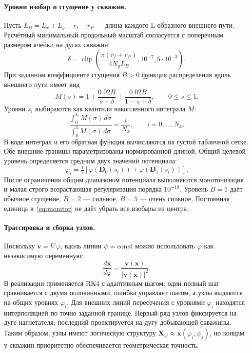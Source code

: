 \documentclass[12pt,a4paper]{article}
\begin{document}
\paragraph{Уровни изобар и сгущение у скважин.}
Пусть $L_B=L_x+L_y-r_I-r_P$ --- длина каждого L-образного внешнего пути.
Расчётный минимальный продольный масштаб согласуется с поперечным размером
ячейки на дугах скважин:
\begin{equation}
 \delta=\operatorname{clip}\!\left(
 \frac{\pi(r_I+r_P)}{4N_yL_B},10^{-7},5\cdot10^{-3}\right).
 \label{eq:grading-core}
\end{equation}
При заданном коэффициенте сгущения $B>0$ функция распределения вдоль
внешнего пути имеет вид
\begin{equation}
 M(s)=1+\frac{0.02B}{s+\delta}
       +\frac{0.02B}{1-s+\delta},\qquad 0\le s\le1.
 \label{eq:monitor}
\end{equation}
Уровни $s_i$ выбираются как квантили накопленного интеграла $M$:
\begin{equation}
 \frac{\int_0^{s_i}M(\sigma)\,d\sigma}
      {\int_0^1M(\sigma)\,d\sigma}=\frac{i}{N_x},
 \qquad i=0,\ldots,N_x.
 \label{eq:monitor-inverse}
\end{equation}
В коде интеграл и его обратная функция вычисляются на густой табличной
сетке. Обе внешние границы параметризованы нормированной длиной.
Общий целевой уровень определяется средним двух значений потенциала:
\begin{equation}
 \widetilde\varphi_i=\tfrac12\left[
 \varphi(\mathbf D_0(s_i))+\varphi(\mathbf D_1(s_i))\right].
 \label{eq:phi-target}
\end{equation}
После ограничения общим диапазоном потенциала выполняются монотонизация и
малая строго возрастающая регуляризация порядка $10^{-10}$. Уровень $B=1$
даёт обычное сгущение, $B=2$ --- сильное, $B=5$ --- очень сильное.
Постоянная единица в~\eqref{eq:monitor} не даёт убрать все изобары из центра.

\paragraph{Трассировка и сборка узлов.}
Поскольку $\mathbf v=\nabla\varphi$, вдоль линии $\psi=\mathrm{const}$
можно использовать $\varphi$ как независимую переменную:
\begin{equation}
 \frac{d\mathbf x}{d\varphi}
 =\frac{\mathbf v(\mathbf x)}{|\mathbf v(\mathbf x)|^2}.
 \label{eq:trace-ode}
\end{equation}
В реализации применяется RK4 с адаптивным шагом: один полный шаг
сравнивается с двумя половинными, ошибка управляет шагом, а узлы выдаются
на общих уровнях $\varphi_i$. Для внешних линий пересечения с уровнями
$\varphi_i$ находятся интерполяцией по точно заданной границе. Первый ряд
узлов фиксируется на дуге нагнетателя; последний проектируется на дугу
добывающей скважины. Таким образом, узлы имеют логическую структуру
$\mathbf X_{ij}\approx\mathbf x(\varphi_i,\psi_j)$, но концам у скважин
приоритетно обеспечивается геометрическая точность.
\end{document}
